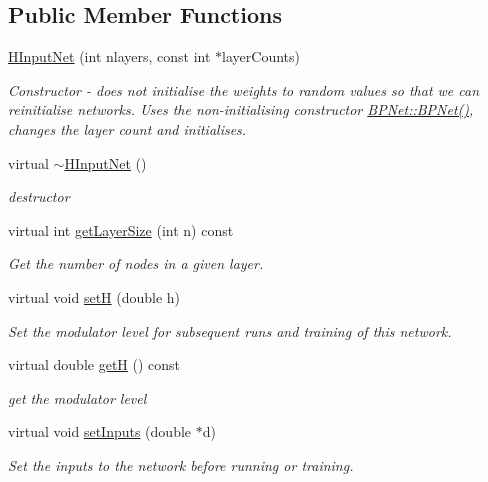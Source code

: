 \subsection*{Public Member Functions}
\begin{DoxyCompactItemize}
\item 
\hyperlink{classHInputNet_ab2690ea39a7b4b1c532fc01eac9bfc10}{H\+Input\+Net} (int nlayers, const int $\ast$layer\+Counts)
\begin{DoxyCompactList}\small\item\em Constructor -\/ does not initialise the weights to random values so that we can reinitialise networks. Uses the non-\/initialising constructor \hyperlink{classBPNet_ad9b8ec22ef6319ebda7b3ac996b76f3e}{B\+P\+Net\+::\+B\+P\+Net()}, changes the layer count and initialises. \end{DoxyCompactList}\item 
virtual \hyperlink{classHInputNet_aa8446ceabf8f34187ee08d61d22db6f7}{$\sim$\+H\+Input\+Net} ()
\begin{DoxyCompactList}\small\item\em destructor \end{DoxyCompactList}\item 
virtual int \hyperlink{classHInputNet_a70a98f13c5a0ee60aaa28438dfc734f8}{get\+Layer\+Size} (int n) const 
\begin{DoxyCompactList}\small\item\em Get the number of nodes in a given layer. \end{DoxyCompactList}\item 
virtual void \hyperlink{classHInputNet_a3ac18a3e39fc58647052518e507ae378}{setH} (double h)
\begin{DoxyCompactList}\small\item\em Set the modulator level for subsequent runs and training of this network. \end{DoxyCompactList}\item 
virtual double \hyperlink{classHInputNet_aa79dc2d56582978e28661e0f6163d163}{getH} () const 
\begin{DoxyCompactList}\small\item\em get the modulator level \end{DoxyCompactList}\item 
virtual void \hyperlink{classHInputNet_a2c463ec5781f9e84865747e8bb085065}{set\+Inputs} (double $\ast$d)
\begin{DoxyCompactList}\small\item\em Set the inputs to the network before running or training. \end{DoxyCompactList}\end{DoxyCompactItemize}
